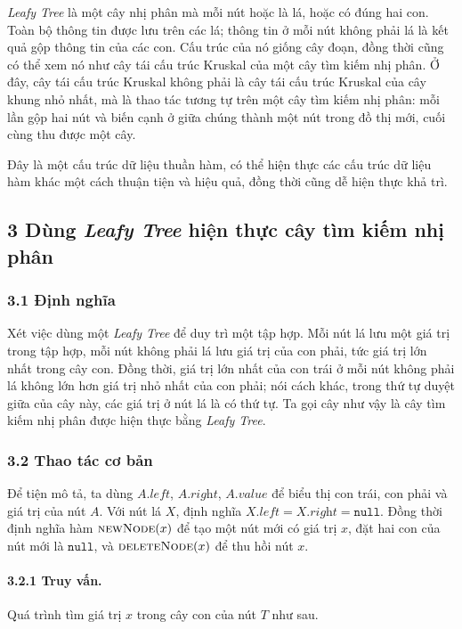 \documentclass[11pt]{article}
\begin{document}
\emph{Leafy Tree} là một cây nhị phân mà mỗi nút hoặc là lá, hoặc có đúng hai
con. Toàn bộ thông tin được lưu trên các lá; thông tin ở mỗi nút không phải lá
là kết quả gộp thông tin của các con. Cấu trúc của nó giống cây đoạn, đồng thời
cũng có thể xem nó như cây tái cấu trúc Kruskal của một cây tìm kiếm nhị phân.
Ở đây, cây tái cấu trúc Kruskal không phải là cây tái cấu trúc Kruskal của cây
khung nhỏ nhất, mà là thao tác tương tự trên một cây tìm kiếm nhị phân: mỗi lần
gộp hai nút và biến cạnh ở giữa chúng thành một nút trong đồ thị mới, cuối cùng
thu được một cây.

Đây là một cấu trúc dữ liệu thuần hàm, có thể hiện thực các cấu trúc dữ liệu
hàm khác một cách thuận tiện và hiệu quả, đồng thời cũng dễ hiện thực khả trì.

\subsection*{3 Dùng \emph{Leafy Tree} hiện thực cây tìm kiếm nhị phân}

\subsubsection*{3.1 Định nghĩa}

Xét việc dùng một \emph{Leafy Tree} để duy trì một tập hợp. Mỗi nút lá lưu một
giá trị trong tập hợp, mỗi nút không phải lá lưu giá trị của con phải, tức giá
trị lớn nhất trong cây con. Đồng thời, giá trị lớn nhất của con trái ở mỗi nút
không phải lá không lớn hơn giá trị nhỏ nhất của con phải; nói cách khác, trong
thứ tự duyệt giữa của cây này, các giá trị ở nút lá là có thứ tự. Ta gọi cây
như vậy là cây tìm kiếm nhị phân được hiện thực bằng \emph{Leafy Tree}.

\subsubsection*{3.2 Thao tác cơ bản}

Để tiện mô tả, ta dùng \(A.\textit{left}\), \(A.\textit{right}\),
\(A.\textit{value}\) để biểu thị con trái, con phải và giá trị của nút \(A\).
Với nút lá \(X\), định nghĩa \(X.\textit{left}=X.\textit{right}=\texttt{null}\).
Đồng thời định nghĩa hàm \(\textsc{newNode}(x)\) để tạo một nút mới có giá trị
\(x\), đặt hai con của nút mới là \(\texttt{null}\), và
\(\textsc{deleteNode}(x)\) để thu hồi nút \(x\).

\paragraph{3.2.1 Truy vấn.}
Quá trình tìm giá trị \(x\) trong cây con của nút \(T\) như sau.
\end{document}
